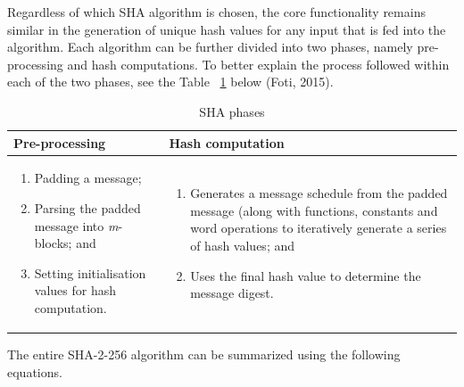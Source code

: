     Regardless of which SHA algorithm is chosen, the core functionality remains similar in the generation of unique hash values for any input that is fed into the algorithm. Each algorithm can be further divided into two phases, namely pre-processing and hash computations. To better explain the process followed within each of the two phases, see the Table ~\ref{table: SHA phases} below (Foti, 2015).
    
    
    \begin{table}[h!]
        \caption{SHA phases}
        \begin{tabular}{|p{} | p{}|}
          \hline
         \textbf{Pre-processing} & \textbf{Hash computation} \\
         \hline\hline
            \begin{enumerate}
                \item Padding a message;
                \item Parsing the padded message into \textit{m}-blocks; and
                \item Setting initialisation values for hash computation.
            \end{enumerate}
             & 
             \begin{enumerate}
                 \item Generates a message schedule from the padded message (along with functions, constants and word operations to iteratively generate a series of hash values; and
                 \item Uses the final hash value to determine the message digest.
             \end{enumerate} \\
             \hline
        \end{tabular}
        \label{table: SHA phases}
    \end{table}
    
    The entire SHA-2-256 algorithm can be summarized using the following equations.
    
    
